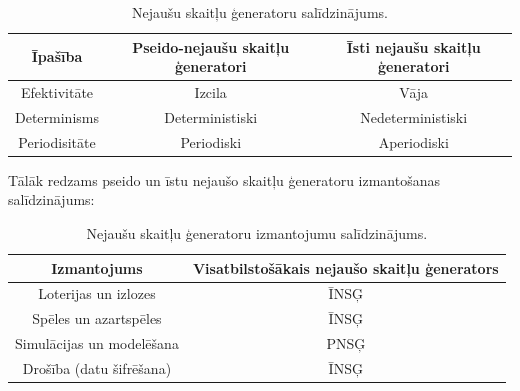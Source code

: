 \documentclass[12pt]{article}
\begin{document}
\begin{table}[!ht]
        \centering
       

\begin{tabular}{ |c|c|c| }%
\hline
Īpašība & \textbf{Pseido-nejaušu skaitļu ģeneratori} & \textbf{Īsti nejaušu skaitļu ģeneratori}  \\
\hline
Efektivitāte & Izcila & Vāja\\
\hline
Determinisms & Deterministiski & Nedeterministiski \\
\hline
Periodisitāte & Periodiski & Aperiodiski \\
\hline
\end{tabular}
        
 \caption{Nejaušu skaitļu ģeneratoru salīdzinājums.\parencite{randomorg}}
\label{tab1}
\end{table}    

Tālāk redzams pseido un īstu nejaušo skaitļu ģeneratoru izmantošanas salīdzinājums:

\begin{table}[!ht]
    \centering
    
\begin{tabular}{ |c|c| }%
\hline
Izmantojums & Visatbilstošākais nejaušo skaitļu ģenerators \\
\hline
Loterijas un izlozes & ĪNSĢ \\
\hline
Spēles un azartspēles & ĪNSĢ \\
\hline
Simulācijas un modelēšana & PNSĢ  \\
\hline
Drošība (datu šifrēšana) & ĪNSĢ \\
\hline
\end{tabular}
\caption{Nejaušu skaitļu ģeneratoru izmantojumu salīdzinājums.\parencite{randomorg}}
\label{tab2}
\end{table}

\pagebreak
    
\end{document}
